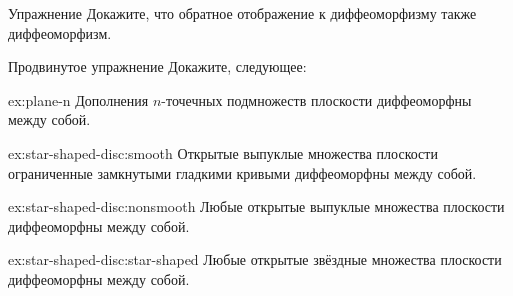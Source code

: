 \begin{thm}{Упражнение}\label{ex:inv-diffeomorphism}
Докажите, что обратное отображение к диффеоморфизму также диффеоморфизм.
\end{thm}

\begin{thm}{Продвинутое упражнение}\label{ex:star-shaped-disc}
Докажите, следующее:

\begin{subthm}{ex:plane-n}
Дополнения $n$-точечных подмножеств плоскости диффеоморфны между собой.
\end{subthm}

\begin{subthm}{ex:star-shaped-disc:smooth}
Открытые выпуклые множества плоскости ограниченные замкнутыми гладкими кривыми диффеоморфны между собой.
\end{subthm}

{\sloppy

\begin{subthm}{ex:star-shaped-disc:nonsmooth}
Любые открытые выпуклые множества плоскости диффеоморфны между собой.
\end{subthm}

\begin{subthm}{ex:star-shaped-disc:star-shaped}
Любые открытые звёздные множества плоскости диффеоморфны между собой.
\end{subthm}

}

\end{thm}
